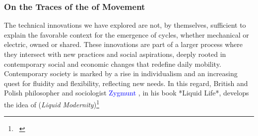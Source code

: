 \begin{refsegment}
\subsubsection*{On the Traces of the  of Movement
    \label{chap1:mobilite-individuelle-legere-contexte-societes-liquides}
    }

The technical innovations we have explored are not, by themselves, sufficient to explain the favorable context for the emergence of cycles, whether mechanical or electric, owned or shared. These innovations are part of a larger process where they intersect with new practices and social aspirations, deeply rooted in contemporary social and economic changes that redefine daily mobility. Contemporary society is marked by a rise in individualism and an increasing quest for fluidity and flexibility, reflecting new needs. In this regard, British and Polish philosopher and sociologist \textcolor{blue}{Zygmunt} \textcolor{blue}{\textcite[7-28]{bauman_liquid_2000}}, in his book *Liquid Life*, develops the idea of  (\textsl{Liquid Modernity})\footnote{~
}
\end{refsegment}
